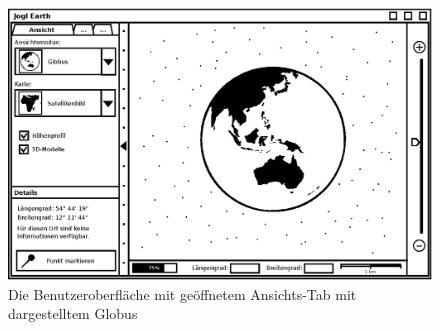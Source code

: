 \documentclass[10pt]{scrreprt}
\begin{document}
\begin{figure}
	\centering
	\includegraphics[scale=0.9]{GUI-Ansicht.eps}
	\caption{Die Benutzeroberfläche mit geöffnetem Ansichts-Tab mit dargestelltem Globus}
\end{figure}
\end{document}
